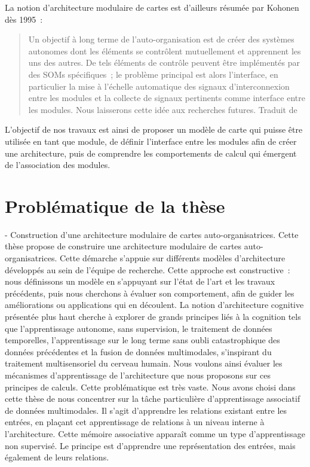 La notion d'architecture modulaire de cartes est d'ailleurs résumée par Kohonen dès 1995~:
\begin{quote}
Un objectif à long terme de l'auto-organisation est de créer des systèmes autonomes dont les éléments se contrôlent mutuellement et apprennent les uns des autres. De tels éléments de contrôle peuvent être implémentés par des SOMs spécifiques~; le problème principal est alors l'interface, en particulier la mise à l'échelle automatique des signaux d'interconnexion entre les modules et la collecte de signaux pertinents comme interface entre les modules. Nous laisserons cette idée aux recherches futures.
Traduit de \cite{Kohonen1995SelfOrganizingM}
\end{quote}

L'objectif de nos travaux est ainsi de proposer un modèle de carte qui puisse être utilisée en tant que module, de définir l'interface entre les modules afin de créer une architecture, puis de comprendre les comportements de calcul qui émergent de l'association des modules.

\section*{Problématique de la thèse}

- Construction d'une architecture modulaire de cartes auto-organisatrices. 
Cette thèse propose de construire une architecture modulaire de cartes auto-organisatrices. Cette démarche s'appuie sur différents modèles d'architecture développés au sein de l'équipe de recherche.
Cette approche est constructive~: nous définissons un modèle en s'appuyant sur l'état de l'art et les travaux précédents, puis nous cherchons à évaluer son comportement, afin de guider les améliorations ou applications qui en découlent.
La notion d'architecture cognitive présentée plus haut cherche à explorer de grands principes liés à la cognition tels que l'apprentissage autonome, sans supervision, le traitement de données temporelles, l'apprentissage sur le long terme sans oubli catastrophique des données précédentes et la fusion de données multimodales, s'inspirant du traitement multisensoriel du cerveau humain.
Nous voulons ainsi évaluer les mécanismes d'apprentissage de l'architecture que nous proposons sur ces principes de calculs. 
Cette problématique est très vaste.
Nous avons choisi dans cette thèse de nous concentrer sur la tâche particulière d'apprentissage associatif de données multimodales. 
Il s'agit d'apprendre les relations existant entre les entrées, en plaçant cet apprentissage de relations à un niveau interne à l'architecture.
Cette mémoire associative apparaît comme un type d'apprentissage non supervisé. Le principe est d'apprendre une représentation des entrées, mais également de leurs relations.


